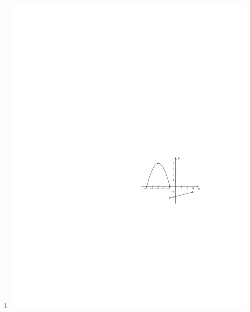 \documentclass{ximera}
\begin{document}
\begin{exercise}
\begin{enumerate}
\item{\includegraphics{WiaFgraphs1-5}}
\end{enumerate}

\begin{selectAll}
\end{selectAll}

\end{exercise}
\end{document}
